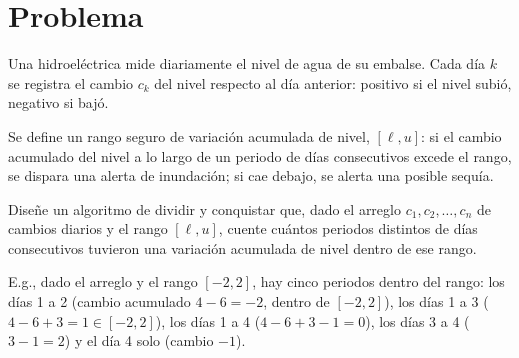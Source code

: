 \section{Problema}
Una hidroeléctrica mide diariamente el nivel de agua de su embalse. Cada día $k$ se registra el cambio $c_k$ del nivel respecto al día anterior: positivo si el nivel subió, negativo si bajó.

Se define un rango seguro de variación acumulada de nivel, $[\ell, u]$: si el cambio acumulado del nivel a lo largo de un periodo de días consecutivos excede el rango, se dispara una alerta de inundación; si cae debajo, se alerta una posible sequía.

Diseñe un algoritmo de dividir y conquistar que, dado el arreglo $c_1, c_2, \ldots, c_n$ de cambios diarios y el rango $[\ell, u]$, cuente cuántos periodos distintos de días consecutivos tuvieron una variación acumulada de nivel dentro de ese rango.

E.g., dado el arreglo \inline{[4, -6, 3, -1]} y el rango $[-2, 2]$, hay cinco periodos dentro del rango: los días 1 a 2 (cambio acumulado $4-6=-2$, dentro de \([-2, 2]\)), los días 1 a 3 ($4-6+3=1 \in [-2, 2]$), los días 1 a 4 ($4-6+3-1=0$), los días 3 a 4 ($3-1=2$) y el día 4 solo (cambio $-1$).